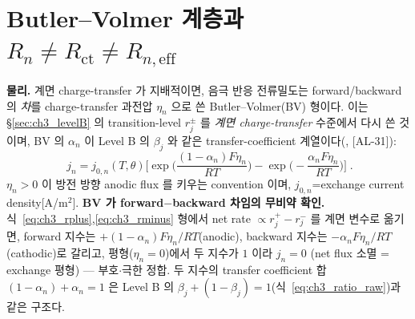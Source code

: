 \documentclass[11pt,a4paper]{article}
\newcommand{\eff}{\mathrm{eff}}
\newcommand{\ct}{\mathrm{ct}}
\newcommand{\AL}[1]{\textsf{[AL-#1]}}
\begin{document}
\section{Butler--Volmer 계층과 $R_n\ne R_\ct\ne R_{n,\eff}$}\label{sec:ch3_bv}
\textbf{물리.} 계면 charge-transfer 가 지배적이면, 음극 반응 전류밀도는 forward/backward 의 \emph{차}를
charge-transfer 과전압 $\eta_n$ 으로 쓴 Butler--Volmer(BV) 형이다. 이는 \S\ref{sec:ch3_levelB} 의 transition-level
$r_j^\pm$ 를 \emph{계면 charge-transfer} 수준에서 다시 쓴 것이며, BV 의 $\alpha_n$ 이 Level B 의 $\beta_j$ 와
같은 transfer-coefficient 계열이다(\cite{bardfaulkner,newman}, \AL{31}):
\begin{equation}
\boxed{\;j_n=j_{0,n}(T,\theta)\Big[\exp\!\Big(\frac{(1-\alpha_n)F\eta_n}{RT}\Big)-\exp\!\Big(-\frac{\alpha_n F\eta_n}{RT}\Big)\Big]\;.}
\label{eq:ch3_bv}
\end{equation}
$\eta_n>0$ 이 방전 방향 anodic flux 를 키우는 convention 이며, $j_{0,n}$=exchange current density[A/m$^2$].
\textbf{BV 가 forward$-$backward 차임의 무비약 확인.} 식~\eqref{eq:ch3_rplus},\allowbreak\eqref{eq:ch3_rminus} 형에서
net rate $\propto r_j^+-r_j^-$ 를 계면 변수로 옮기면, forward 지수는 $+(1-\alpha_n)F\eta_n/RT$(anodic),
backward 지수는 $-\alpha_n F\eta_n/RT$(cathodic)로 갈리고, 평형($\eta_n=0$)에서 두 지수가 $1$ 이라 $j_n=0$
(net flux 소멸 = exchange 평형) — 부호$\cdot$극한 정합. 두 지수의 transfer coefficient 합 $(1-\alpha_n)+\alpha_n=1$
은 Level B 의 $\beta_j+(1-\beta_j)=1$(식~\eqref{eq:ch3_ratio_raw})과 같은 구조다.
\end{document}

